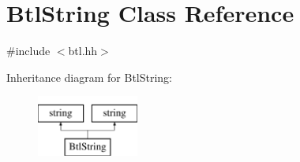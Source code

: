 \hypertarget{class_btl_string}{}\section{Btl\+String Class Reference}
\label{class_btl_string}


{\ttfamily \#include $<$btl.\+hh$>$}

Inheritance diagram for Btl\+String\+:\begin{figure}[H]
\begin{center}
\leavevmode
\includegraphics[height=2.000000cm]{class_btl_string}
\end{center}
\end{figure}
